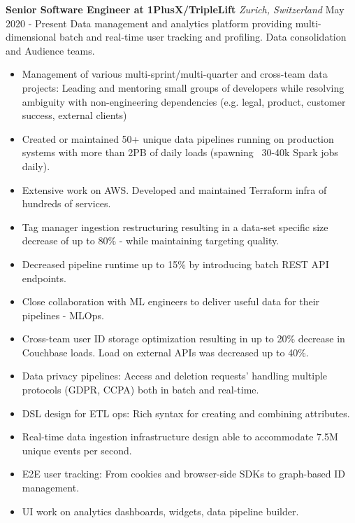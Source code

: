 \documentclass{article}
\begin{document}
        \begin{flushleft}
            \textbf{\large Senior Software Engineer at 1PlusX/TripleLift} \textit{\footnotesize Zurich, Switzerland} \hfill \small May 2020 - Present \newline
            Data management and analytics platform providing multi-dimensional batch and real-time user tracking and profiling. Data consolidation and Audience teams. 
            \newline
            \begin{itemize}
                \item Management of various multi-sprint/multi-quarter and cross-team data projects: Leading and mentoring small groups of developers while resolving ambiguity with non-engineering dependencies (e.g. legal, product, customer success, external clients)
                \item Created or maintained 50+ unique data pipelines running on production systems with more than 2PB of daily loads (spawning ~30-40k Spark jobs daily).
                \item Extensive work on AWS. Developed and maintained Terraform infra of hundreds of services.
                \item Tag manager ingestion restructuring resulting in a data-set specific size decrease of up to 80\% - while maintaining targeting quality.
                \item Decreased pipeline runtime up to 15\% by introducing batch REST API endpoints.
                \item Close collaboration with ML engineers to deliver useful data for their pipelines - MLOps.
                \item Cross-team user ID storage optimization resulting in up to 20\% decrease in Couchbase loads. Load on external APIs was decreased up to 40\%. 
                \item Data privacy pipelines: Access and deletion requests' handling multiple protocols (GDPR, CCPA) both in batch and real-time.
			\item DSL design for ETL ops: Rich syntax for creating and combining attributes.
			\item Real-time data ingestion infrastructure design able to accommodate 7.5M unique events per second.
			\item E2E user tracking: From cookies and browser-side SDKs to graph-based ID management.
                \item UI work on analytics dashboards, widgets, data pipeline builder.
            \end{itemize}
                                          \\ [1ex] 
        \end{flushleft}
\end{document}

